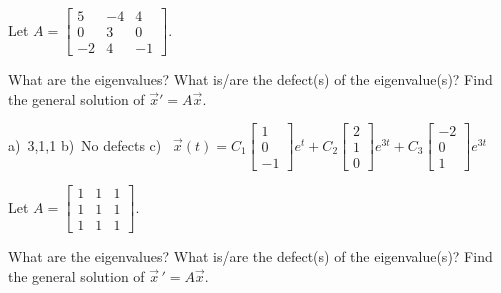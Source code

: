 \begin{samepage}
\begin{exercise}
Let
$A = \left[ \begin{smallmatrix}
5 & -4 & 4 \\
0 & 3 & 0 \\
-2 & 4 & -1
\end{smallmatrix} \right]$.
\begin{tasks}
\task What are the eigenvalues?
\task What is/are the defect(s) of the eigenvalue(s)?
\task Find the general solution of ${\vec{x}}' = A \vec{x}$.
\end{tasks}
\end{exercise}
\end{samepage}
\comboSol{%
}
{%
a)~3,1,1 \quad b)~No defects \quad c)~ $\vec{x}(t) = C_1\left[\begin{smallmatrix} 1 \\ 0 \\ -1 \end{smallmatrix}\right]e^t + C_2\left[\begin{smallmatrix} 2 \\ 1 \\ 0 \end{smallmatrix}\right]e^{3t} + C_3\left[\begin{smallmatrix} -2 \\ 0 \\ 1 \end{smallmatrix}\right]e^{3t}$
}

\begin{exercise}\ansMark%
Let $A =
\left[ \begin{smallmatrix}
1 & 1 & 1 \\
1 & 1 & 1 \\
1 & 1 & 1 
\end{smallmatrix}\right]$.  
\begin{tasks}
\task What are the eigenvalues?
\task What is/are the defect(s) of the eigenvalue(s)?
\task Find the general solution of $\vec{x}\,' = A\vec{x}$.
\end{tasks}
\end{exercise}

